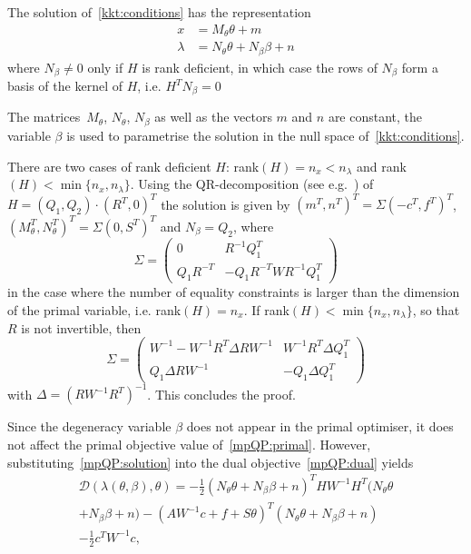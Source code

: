 \documentclass{ifacconf}
\begin{document}
\begin{thm}\label{thm:mpQP:solution}
The solution of~\eqref{kkt:conditions} has the representation
\begin{equation}\label{mpQP:solution}
	\begin{split}
		x &= M_\theta \theta + m\\
		\lambda &= N_\theta \theta + N_\beta \beta + n
	\end{split}
\end{equation}
where $N_\beta\neq 0$ only if $H$ is rank deficient, in which case the rows
of $N_\beta$ form a basis of the kernel of $H$, i.e. $H^TN_\beta=0$
\end{thm}
%
The matrices~$M_\theta$, $N_\theta$, $N_\beta$ as well as the vectors $m$ and $n$
are constant, the variable $\beta$ is used to parametrise the solution in the null space of~\eqref{kkt:conditions}.
%
\begin{pf}
There are two cases of rank deficient $H$: rank$(H)=n_x<n_\lambda$ and
rank$(H)<\min\{n_x,n_\lambda\}$.
Using the QR-decomposition (see e.g.~\cite{Nocedal:2006}) of $H=(Q_1,Q_2)\cdot(R^T,0)^T$ the solution 
is given by $(m^T,n^T)^T = \Sigma (-c^T,f^T)^T$, $(M_\theta^T,N_\theta^T)^T = 
\Sigma (0,S^T)^T$ and $N_\beta=Q_2$, where 
\begin{equation}
	\Sigma = \left(\begin{array}{cc}
	0 & R^{-1}Q_1^T \\
	Q_1 R^{-T} & -Q_1R^{-T}WR^{-1}Q_1^T
	\end{array}\right)
\end{equation}
in the case where the number of equality constraints is larger than the dimension of
the primal variable, i.e. rank$(H)=n_x$. If rank$(H)<\min\{n_x,n_\lambda\}$, so that $R$ is
not invertible, then
\begin{equation}
	\Sigma = \left(\begin{array}{cc}
	W^{-1}-W^{-1}R^T\Delta RW^{-1} & W^{-1}R^{T}\Delta Q_1^{T}\\
	Q_1\Delta R W^{-1} & -Q_1\Delta Q_1^T
	\end{array}\right)
\end{equation}
with $\Delta = (RW^{-1}R^T)^{-1}$. This concludes the proof.
\end{pf}
%
Since the degeneracy variable $\beta$ does not appear in the
primal optimiser, it does not affect the primal objective value of~\eqref{mpQP:primal}.
However, substituting~\eqref{mpQP:solution} into the dual objective~\eqref{mpQP:dual} yields
\begin{multline}
    \mathcal D(\lambda(\theta,\beta),\theta) =  -\frac{1}{2}(N_\theta \theta + N_\beta \beta + n)^T H W^{-1}H^T 
	(N_\theta \theta\\ + N_\beta \beta + n)
	-(AW^{-1}c + 
	f + S\theta)^T(N_\theta \theta + N_\beta \beta + n)\\ -\frac{1}{2}c^TW^{-1}c,
\end{multline}
\end{document}
